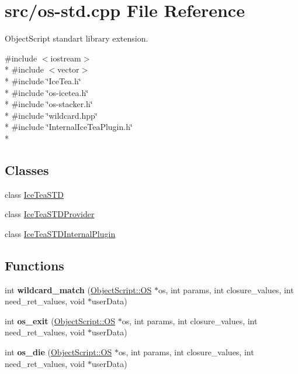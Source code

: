 \hypertarget{os-std_8cpp}{}\section{src/os-\/std.cpp File Reference}
\label{os-std_8cpp}


Object\+Script standart library extension.  


{\ttfamily \#include $<$iostream$>$}\\*
{\ttfamily \#include $<$vector$>$}\\*
{\ttfamily \#include \char`\"{}Ice\+Tea.\+h\char`\"{}}\\*
{\ttfamily \#include \char`\"{}os-\/icetea.\+h\char`\"{}}\\*
{\ttfamily \#include \char`\"{}os-\/stacker.\+h\char`\"{}}\\*
{\ttfamily \#include \char`\"{}wildcard.\+hpp\char`\"{}}\\*
{\ttfamily \#include \char`\"{}Internal\+Ice\+Tea\+Plugin.\+h\char`\"{}}\\*
\subsection*{Classes}
\begin{DoxyCompactItemize}
\item 
class \hyperlink{class_ice_tea_s_t_d}{Ice\+Tea\+S\+TD}
\item 
class \hyperlink{class_ice_tea_s_t_d_provider}{Ice\+Tea\+S\+T\+D\+Provider}
\item 
class \hyperlink{class_ice_tea_s_t_d_internal_plugin}{Ice\+Tea\+S\+T\+D\+Internal\+Plugin}
\end{DoxyCompactItemize}
\subsection*{Functions}
\begin{DoxyCompactItemize}
\item 
int {\bfseries wildcard\+\_\+match} (\hyperlink{class_object_script_1_1_o_s}{Object\+Script\+::\+OS} $\ast$os, int params, int closure\+\_\+values, int need\+\_\+ret\+\_\+values, void $\ast$user\+Data)\hypertarget{os-std_8cpp_a1964787b3fadbaa5ce9fcba9ef69f05f}{}\label{os-std_8cpp_a1964787b3fadbaa5ce9fcba9ef69f05f}

\item 
int {\bfseries os\+\_\+exit} (\hyperlink{class_object_script_1_1_o_s}{Object\+Script\+::\+OS} $\ast$os, int params, int closure\+\_\+values, int need\+\_\+ret\+\_\+values, void $\ast$user\+Data)\hypertarget{os-std_8cpp_a0f5e51c9869cef795f80cdce06591bb3}{}\label{os-std_8cpp_a0f5e51c9869cef795f80cdce06591bb3}

\item 
int {\bfseries os\+\_\+die} (\hyperlink{class_object_script_1_1_o_s}{Object\+Script\+::\+OS} $\ast$os, int params, int closure\+\_\+values, int need\+\_\+ret\+\_\+values, void $\ast$user\+Data)\hypertarget{os-std_8cpp_a9b87804d882b6aba1df25c3d76ceb0c9}{}\label{os-std_8cpp_a9b87804d882b6aba1df25c3d76ceb0c9}

\end{DoxyCompactItemize}
